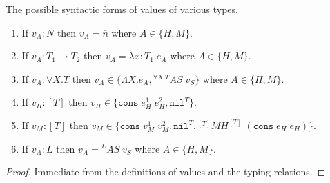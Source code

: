 \begin{lemma}
\label{cf}
\onehalfspacing
The possible syntactic forms of values of various types.
\begin{enumerate}
\item If $v_{A}:N$ then $v_{A}=\overline{n}$ where $A\in\lbrace H,M\rbrace$.
\item If $v_{A}:T_{1}\rightarrow T_{2}$ then $v_{A}=\lambda x:T_{1}.e_{A}$ where $A\in\lbrace H,M\rbrace$.
\item If $v_{A}:\forall X.T$ then $v_{A}\in\lbrace\Lambda X.e_{A},{^{\forall X.T}A}S\;v_{S}\rbrace$ where $A\in\lbrace H,M\rbrace$.
\item If $v_{H}:[T]$ then $v_{H}\in\lbrace\mathtt{cons}\;e_{H}^{1}\;e_{H}^{2},\mathtt{nil}^{T}\rbrace$.
\item If $v_{M}:[T]$ then $v_{M}\in\lbrace\mathtt{cons}\;v_{M}^{1}\;v_{M}^{2},\mathtt{nil}^{T},{^{[T]}M}H^{[T]}\;(\mathtt{cons}\;e_{H}\;e_{H})\rbrace$.
\item If $v_{A}:L$ then $v_{A}={^{L}A}S\;v_{S}$ where $A\in\lbrace H,M\rbrace$.
\end{enumerate}
\begin{proof}
Immediate from the definitions of values and the typing relations.
\end{proof}
\end{lemma}